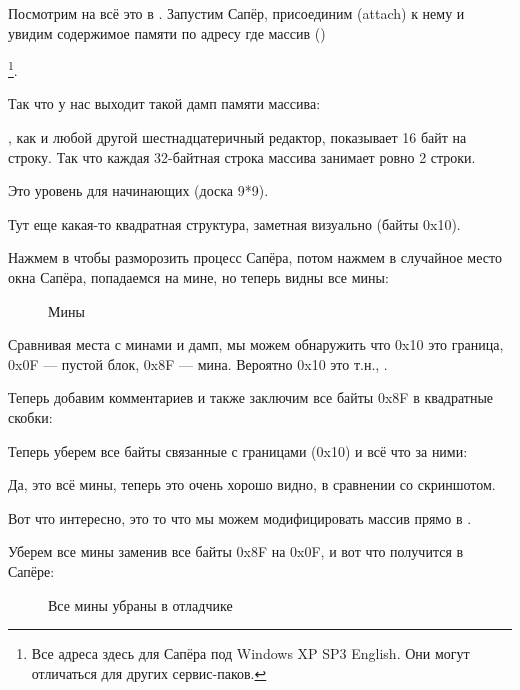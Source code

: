 Посмотрим на всё это в \olly.
Запустим Сапёр, присоединим (attach) \olly к нему и увидим содержимое памяти по адресу где массив  ()%

\footnote{Все адреса здесь для Сапёра под Windows XP SP3 English. 
Они могут отличаться для других сервис-паков.}.

Так что у нас выходит такой дамп памяти массива:



\olly, как и любой другой шестнадцатеричный редактор, показывает 16 байт на строку.
Так что каждая 32-байтная строка массива занимает ровно 2 строки.

Это уровень для начинающих (доска 9*9).

Тут еще какая-то квадратная структура, заметная визуально (байты 0x10).

Нажмем  в \olly чтобы разморозить процесс Сапёра, потом нажмем в случайное место окна Сапёра, попадаемся на мине, но теперь
видны все мины:

\begin{figure}[H]
\centering
{}
\caption{Мины}
\label{fig:minesweeper1}
\end{figure}

Сравнивая места с минами и дамп, мы можем обнаружить что 0x10 это граница, 0x0F --- пустой блок, 
0x8F --- мина.
Вероятно 0x10 это т.н., .

Теперь добавим комментариев и также заключим все байты 0x8F в квадратные скобки:%



Теперь уберем все байты связанные с границами (0x10) и всё что за ними:%



Да, это всё мины, теперь это очень хорошо видно, в сравнении со скриншотом.

\clearpage
Вот что интересно, это то что мы можем модифицировать массив прямо в \olly.%

Уберем все мины заменив все байты 0x8F на 0x0F, и вот что получится в Сапёре:

\begin{figure}[H]
\centering
{}
\caption{Все мины убраны в отладчике}
\label{fig:minesweeper3}
\end{figure}

